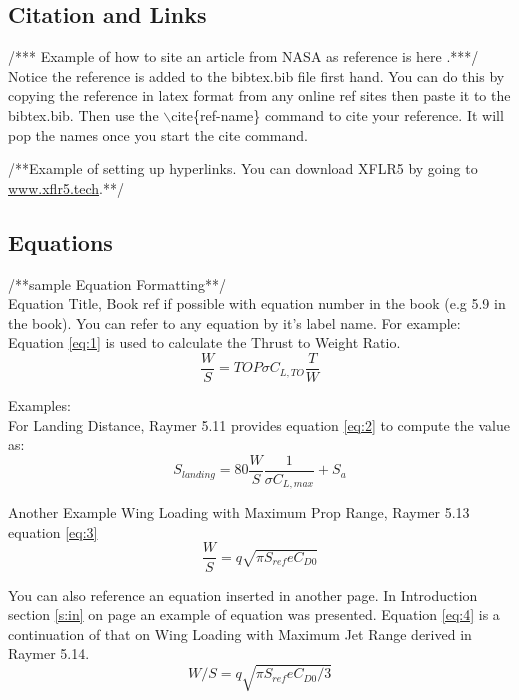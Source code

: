 \subsection{Citation and Links}
/*** Example of how to site an article from NASA as reference is here \cite{CLSI}.***/  Notice the reference is added to the bibtex.bib file first hand. You can do this by copying the reference in latex format from any online ref sites then paste it to the bibtex.bib. Then use the $\backslash$cite\{ref-name\} command to cite your reference. It will pop the names once you start the cite command.

/**Example of setting up hyperlinks. You can download XFLR5 by going to  \href{http://www.xflr5.tech/xflr5.htm}{www.xflr5.tech}.**/

\subsection{Equations}
/**sample Equation Formatting**/\\ %
Equation Title, Book ref if possible with equation number in the book (e.g 5.9 in the book). You can refer to any equation by it's label name. For example: Equation \ref{eq:1} is used to calculate the Thrust to Weight Ratio.
\begin{equation} 
\label{eq:1}
    \frac{W}{S} = TOP \sigma C_{L,TO} \frac{T}{W} %
\end{equation}

Examples: \\
For Landing Distance, Raymer 5.11 provides equation \ref{eq:2} to compute the value as:
\begin{equation}
\label{eq:2}
    S_{landing} = 80 \frac{W}{S}\frac{1}{\sigma C_{L,max}} + S_a
\end{equation}

Another Example Wing Loading with Maximum Prop Range, Raymer 5.13 equation \ref{eq:3}
\begin{equation}
\label{eq:3}
    \frac{W}{S} = q \sqrt{\pi S_{ref} e C_{D0}}
\end{equation}

You can also reference an equation inserted in another page. In Introduction section \ref{s:in} on page \pageref{eq:1} an example of equation was presented. Equation \ref{eq:4} is a continuation of that on Wing Loading with Maximum Jet Range derived in Raymer 5.14. 
\begin{equation}
\label{eq:4}
    W/S = q \sqrt{\pi S_{ref} e C_{D0}/3}
\end{equation}
